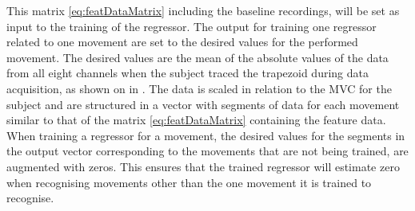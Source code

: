 
This matrix \ref{eq:featDataMatrix} including the baseline recordings, will be set as input to the training of the regressor. The output for training one regressor related to one movement are set to the desired values for the performed movement. The desired values are the mean of the absolute values of the data from all eight channels when the subject traced the trapezoid during data acquisition, as shown on  in . The data is scaled in relation to the MVC for the subject and are structured in a vector with segments of data for each movement similar to that of the matrix \ref{eq:featDataMatrix} containing the feature data. When training a regressor for a movement, the desired values for the segments in the output vector corresponding to the movements that are not being trained, are augmented with zeros. This ensures that the trained regressor will estimate zero when recognising movements other than the one movement it is trained to recognise. \\
%
